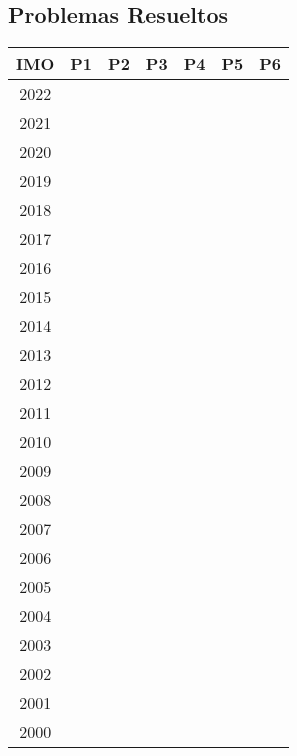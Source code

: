 \documentclass[11pt]{scrartcl}
\begin{document}
    \subsection*{Problemas Resueltos}
    \begin{center} 
        \begin{tabular}{| c | c | c | c | c | c | c |}
            \hline
            IMO & P1 & P2 & P3 & P4 & P5 & P6 \\
            \hline
            2022 & & & & & & \\
            \hline
            2021 & & & & & & \\
            \hline
            2020 & & & & & & \\
            \hline
            2019 & & & & & & \\
            \hline
            2018 & & & & & & \\
            \hline
            2017 & & & & & & \\
            \hline
            2016 & & & & & & \\
            \hline
            2015 & & & & & & \\
            \hline
            2014 & & & & & & \\
            \hline
            2013 & & & & & & \\
            \hline
            2012 & & & & & & \\
            \hline
            2011 & & & & & & \\
            \hline
            2010 & & & & & & \\
            \hline
            2009 & & & & & & \\
            \hline
            2008 & & & & & & \\
            \hline
            2007 & & & & & & \\
            \hline
            2006 & & & & & & \\
            \hline
            2005 & & & & & & \\
            \hline
            2004 & & & & & & \\
            \hline
            2003 & & & & & & \\
            \hline
            2002 & & & & & & \\
            \hline
            2001 & & & & & & \\
            \hline
            2000 & & & & & & \\
            \hline
        \end{tabular}
    \end{center}
    \eject
\end{document}
